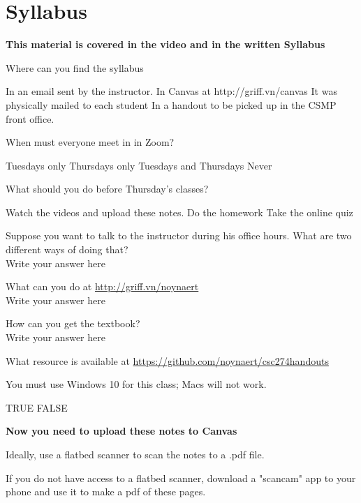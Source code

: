 \documentclass[letterpaper,12pt]{exam}
\begin{document}
\section*{Syllabus}
\begin{center}
	\textbf{This material is covered in the video and in the written Syllabus}
\end{center}
\begin{questions}
	\question Where can you find the syllabus
	\begin{checkboxes}
	\choice In an email sent by the instructor.
	\choice In Canvas at http://griff.vn/canvas
	\choice It was physically mailed to each student
	\choice In a handout to be picked up in the CSMP front office.
	\end{checkboxes}

	\question When must everyone meet in in Zoom?
	\begin{checkboxes}
	\choice Tuesdays only
	\choice Thursdays only
	\choice Tuesdays and Thursdays
	\choice Never
	\end{checkboxes}

	\question What should you do before Thursday's classes?
	\begin{checkboxes}
	\choice Watch the videos and upload these notes.
	\choice Do the homework
	\choice Take the online quiz
	\end{checkboxes}

	\question Suppose you want to talk to the instructor during his office hours.  What are two different ways of doing that?
	\\{\color{blue} Write your answer here }
	\vspace{1.5cm}

	\question What can you do at \url{http://griff.vn/noynaert }
	\\{\color{blue} Write your answer here }
	\vspace{1.5cm}

	\question How can you get the textbook? 
	\\{\color{blue} Write your answer here }
	\vspace{1.5cm}

	\question What resource is available at  \url{https://github.com/noynaert/csc274handouts}
	\vspace{1.5cm}

	\question You must use Windows 10 for this class; Macs will not work.
	\begin{checkboxes}
	\choice TRUE
	\choice FALSE

	\end{checkboxes}

\end{questions}
\vspace{1cm}
\begin{center}
	\textbf{Now you need to upload these notes to Canvas}

	Ideally, use a flatbed scanner to scan the notes to a .pdf file.

	If you do not have access to a flatbed scanner, download a "scancam" app to your phone and use it to make a pdf of these pages.
\end{center}
\vspace{1cm}
\end{document}

